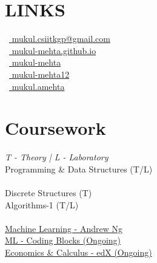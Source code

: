 \documentclass[]{deedy-resume-openfont}
\begin{document}
\begin{minipage}[t]{0.33\textwidth}

\section{LINKS} 
\faEnvelope\ {\href{mailto:mukul.csiitkgp@gmail.com}{ mukul.csiitkgp@gmail.com}}\\
\faGlobe\ {\href{https://mukul-mehta.github.io/}{ mukul-mehta.github.io}}\\
\faGithub\ {\href{https://github.com/mukul-mehta}{ mukul-mehta}}\\
\faLinkedinSquare\ {\href{https://www.linkedin.com/in/mukul-mehta12}{ mukul-mehta12}}\\
\faFacebookSquare\ {\href{https://www.facebook.com/mukul.amehta}{ mukul.amehta}} \\

\sectionsep


\section{Coursework}
\emph{T - Theory | L - Laboratory}\\
Programming \& Data Structures (T/L)\\~\\
Discrete Structures (T)\\
Algorithms-1 (T/L) \\~\\
\href{https://www.coursera.org/learn/machine-learning}{Machine Learning - Andrew Ng}\\
\href{https://online.codingblocks.com/courses/40}{ML - Coding Blocks (Ongoing)}\\
\href{https://courses.edx.org/courses/course-v1:CaltechX+Ec1011x+1T2018/course/}{Economics \& Calculus - edX (Ongoing)}

\sectionsep



%
%

\end{minipage} 
\hfill
\end{document}
